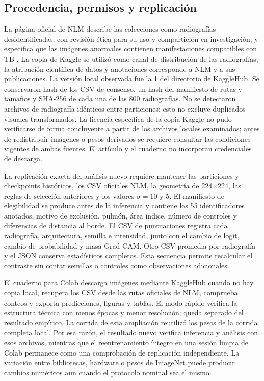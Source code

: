 \documentclass[conference]{IEEEtran}
\begin{document}
\subsection{Procedencia, permisos y replicación}
La página oficial de NLM describe las colecciones como radiografías desidentificadas, con revisión ética para su uso y compartición en investigación, y especifica que las imágenes anormales contienen manifestaciones compatibles con TB \cite{nlmdata}. La copia de Kaggle se utilizó como canal de distribución de las radiografías; la atribución científica de datos y anotaciones corresponde a NLM y a sus publicaciones. La versión local observada fue la 1 del directorio de KaggleHub. Se conservaron hash de los CSV de consenso, un hash del manifiesto de rutas y tamaños y SHA-256 de cada una de las 800 radiografías. No se detectaron archivos de radiografía idénticos entre particiones; esto no excluye duplicados visuales transformados. La licencia específica de la copia Kaggle no pudo verificarse de forma concluyente a partir de los archivos locales examinados; antes de redistribuir imágenes o pesos derivados se requiere consultar las condiciones vigentes de ambas fuentes. El artículo y el cuaderno no incorporan credenciales de descarga.

La replicación exacta del análisis nuevo requiere mantener las particiones y checkpoints históricos, los CSV oficiales NLM, la geometría de 224$\times$224, las reglas de selección anteriores y los valores $\sigma=10$ y 5. El manifiesto de elegibilidad se produce antes de la inferencia y contiene los 55 identificadores anotados, motivo de exclusión, pulmón, área índice, número de controles y diferencias de distancia al borde. El CSV de puntuaciones registra cada radiografía, arquitectura, semilla e intensidad, junto con el cambio de logit, cambio de probabilidad y masa Grad-CAM. Otro CSV promedia por radiografía y el JSON conserva estadísticos completos. Esta secuencia permite recalcular el contraste sin contar semillas o controles como observaciones adicionales.

El cuaderno para Colab descarga imágenes mediante KaggleHub cuando no hay copia local, recupera los CSV desde las rutas oficiales de NLM, comprueba conteos y exporta predicciones, figuras y tablas. El modo rápido verifica la estructura técnica con menos épocas y menor resolución; queda separado del resultado empírico. La corrida de esta ampliación reutilizó los pesos de la corrida completa local. Por esa razón, el resultado nuevo verifica inferencia y análisis con esos archivos, mientras que el reentrenamiento íntegro en una sesión limpia de Colab permanece como una comprobación de replicación independiente. La variación entre bibliotecas, hardware o pesos de ImageNet puede producir cambios numéricos aun cuando el protocolo nominal sea el mismo.
\end{document}
